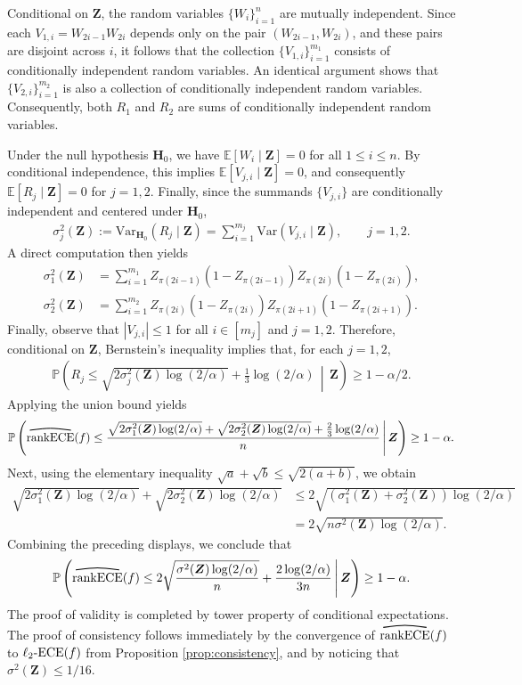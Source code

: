 \documentclass[11pt]{article}
\numberwithin{equation}{section}
\theoremstyle{definition}
\newcommand{\E}{\mathbb{E}}
\renewcommand{\P}{\mathbb{P}}
\newcommand{\bZ}{\bm{Z}}
\newcommand{\myoverline}[2][3.5em]{%
  \overset{%
    \tikz[baseline=-0.1ex]{
      \draw[line width=0.75pt]
        (0,0) .. controls (#1/2,0.5ex) .. (#1,0);
    }%
  }{#2}%
}
\newcommand{\Var}{\mathrm{Var}}
\newcommand{\ECE}{\mathrm{ECE}}
\newcommand{\lECE}{\ell_2\textnormal{-}\ECE}
\newcommand{\rankECE}{\mathrm{rankECE}}
\newcommand{\hatrankECE}{\myoverline{\rankECE}}
\begin{document}
Conditional on $\bZ$, the random variables $\{W_i\}_{i=1}^n$ are mutually independent. Since each $V_{1,i}=W_{2i-1}W_{2i}$ depends only on the pair $(W_{2i-1},W_{2i})$, and these pairs are disjoint across $i$, it follows that the collection $\{V_{1,i}\}_{i=1}^{m_1}$ consists of conditionally independent random variables. An identical argument shows that $\{V_{2,i}\}_{i=1}^{m_2}$ is also a collection of conditionally independent random variables. Consequently, both $R_1$ and $R_2$ are sums of conditionally independent random variables.

Under the null hypothesis $\bm H_0$, we have $\E[W_i\mid\bZ]=0$ for all $1\leq i\leq n$. By conditional independence, this implies $\E[V_{j,i}\mid\bZ]=0$, and consequently $\E[R_j\mid\bZ]=0$ for $j=1,2$. Finally, since the summands $\{V_{j,i}\}$ are conditionally independent and centered under $\bm H_0$,
\begin{align*}
    \sigma_j^2(\bZ)
    :=\Var_{\bm H_0}(R_j\mid\bZ)
    =\sum_{i=1}^{m_j}\Var\!\left(V_{j,i}\mid\bZ\right),
    \qquad j=1,2.
\end{align*}
A direct computation then yields
\begin{align*}
    \sigma_1^2(\bZ)
    &=
    \sum_{i=1}^{m_1}
    Z_{\pi(2i-1)}\!\left(1-Z_{\pi(2i-1)}\right)
    Z_{\pi(2i)}\!\left(1-Z_{\pi(2i)}\right),\\
    \sigma_2^2(\bZ)
    &=
    \sum_{i=1}^{m_2}
    Z_{\pi(2i)}\!\left(1-Z_{\pi(2i)}\right)
    Z_{\pi(2i+1)}\!\left(1-Z_{\pi(2i+1)}\right).
\end{align*}
Finally, observe that $|V_{j,i}|\leq 1$ for all $i\in[m_j]$ and $j=1,2$. Therefore, conditional on $\bZ$, Bernstein's inequality implies that, for each $j=1,2$,
\begin{align*}
    \P\left(R_j\leq \sqrt{2\sigma_j^2(\bZ)\log(2/\alpha)} + \frac{1}{3}\log(2/\alpha)\,\middle|\,\bZ\right)\geq 1-\alpha/2.
\end{align*}
Applying the union bound yields
\begin{align*}
    \P\left(\hatrankECE(f)\leq \frac{\sqrt{2\sigma_1^2(\bZ)\log(2/\alpha)} + \sqrt{2\sigma_2^2(\bZ)\log(2/\alpha)} + \frac{2}{3}\log(2/\alpha)}{n}\,\middle|\, \bZ\right)\geq 1-\alpha.
\end{align*}
Next, using the elementary inequality $\sqrt{a}+\sqrt{b}\leq \sqrt{2(a+b)}$, we obtain
\begin{align*}
    \sqrt{2\sigma_1^2(\bZ)\log(2/\alpha)}
    +\sqrt{2\sigma_2^2(\bZ)\log(2/\alpha)}
    &\leq
    2\sqrt{\left(\sigma_1^2(\bZ)+\sigma_2^2(\bZ)\right)\log(2/\alpha)}\\
    &=2\sqrt{n\sigma^2(\bZ)\log(2/\alpha)}.
\end{align*}
Combining the preceding displays, we conclude that
\begin{align*}
    \P\left(\hatrankECE(f)\leq 2\sqrt{\frac{\sigma^2(\bZ)\log(2/\alpha)}{n}}+\frac{2\log(2/\alpha)}{3n}\,\middle|\,\bZ\right)\geq 1-\alpha.
\end{align*}
The proof of validity is completed by tower property of conditional expectations. The proof of consistency follows immediately by the convergence of $\hatrankECE(f)$ to $\lECE(f)$ from Proposition \ref{prop:consistency}, and by noticing that $\sigma^2(\bZ)\leq 1/16$.
\end{document}
